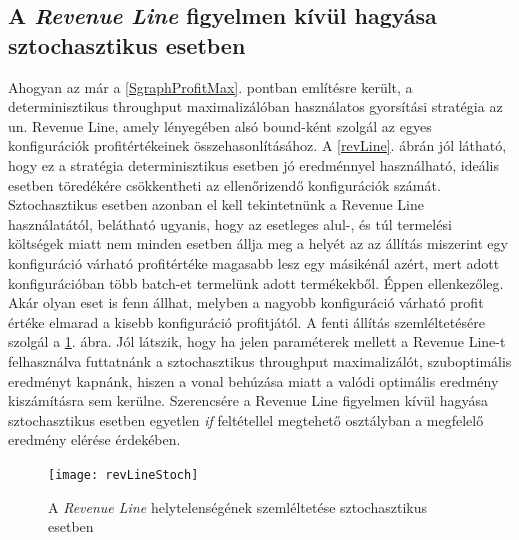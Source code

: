 \subsection{A \textit{Revenue Line} figyelmen kívül hagyása sztochasztikus esetben}
Ahogyan az már a \ref{SgraphProfitMax}. pontban említésre került, a determinisztikus throughput maximalizálóban használatos gyorsítási stratégia az un. Revenue Line, amely lényegében alsó bound-ként szolgál az egyes konfigurációk profitértékeinek összehasonlításához.
A \ref{revLine}. ábrán jól látható, hogy ez a stratégia determinisztikus esetben jó eredménnyel használható, ideális esetben töredékére csökkentheti az ellenőrizendő konfigurációk számát.
Sztochasztikus esetben azonban el kell tekintetnünk a Revenue Line használatától, belátható ugyanis, hogy az esetleges alul-, és túl termelési költségek miatt nem minden esetben állja meg a helyét az az állítás miszerint egy konfiguráció várható profitértéke magasabb lesz egy másikénál azért, mert adott konfigurációban több batch-et termelünk adott termékekből.
Éppen ellenkezőleg.
Akár olyan eset is fenn állhat, melyben a nagyobb konfiguráció várható profit értéke elmarad a kisebb konfiguráció profitjától.
A fenti állítás szemléltetésére szolgál a \ref{revLineStoch}. ábra.
Jól látszik, hogy ha jelen paraméterek mellett a Revenue Line-t felhasználva futtatnánk a sztochasztikus throughput maximalizálót, szuboptimális eredményt kapnánk, hiszen a vonal behúzása miatt a valódi optimális eredmény kiszámításra sem kerülne.
Szerencsére a Revenue Line figyelmen kívül hagyása sztochasztikus esetben egyetlen \textit{if} feltétellel megtehető  osztályban a megfelelő eredmény elérése érdekében.
\begin{figure}[H]
\begin{center}
\texttt{[image: revLineStoch]}
\caption{A \textit{Revenue Line} helytelenségének szemléltetése sztochasztikus esetben}
\label{revLineStoch}
\end{center}
\end{figure} 
